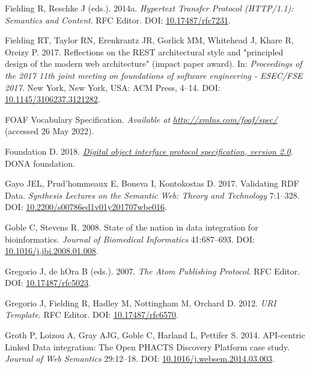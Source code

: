 \begin{CSLReferences}{1}{0}
\leavevmode{}%
Fielding R, Reschke J (eds.). 2014a. \emph{Hypertext Transfer Protocol (HTTP/1.1): Semantics and Content}. RFC Editor. DOI: \href{https://doi.org/10.17487/rfc7231}{10.17487/rfc7231}.

\leavevmode{}%
Fielding RT, Taylor RN, Erenkrantz JR, Gorlick MM, Whitehead J, Khare R, Oreizy P. 2017. Reflections on the REST architectural style and "principled design of the modern web architecture" (impact paper award). In: \emph{Proceedings of the 2017 11th joint meeting on foundations of software engineering - ESEC/FSE 2017}. New York, New York, USA: ACM Press, 4--14. DOI: \href{https://doi.org/10.1145/3106237.3121282}{10.1145/3106237.3121282}.

\leavevmode{}%
FOAF Vocabulary Specification. \emph{Available at} \href{http://xmlns.com/foaf/spec/}{\emph{http://xmlns.com/foaf/spec/}} (accessed 26 May 2022).

\leavevmode{}%
Foundation D. 2018. \emph{\href{https://hdl.handle.net/0.DOIP/DOIPV2.0}{Digital object interface protocol specification, version 2.0}}. DONA foundation.

\leavevmode{}%
Gayo JEL, Prud'hommeaux E, Boneva I, Kontokostas D. 2017. Validating RDF Data. \emph{Synthesis Lectures on the Semantic Web: Theory and Technology} 7:1--328. DOI: \href{https://doi.org/10.2200/s00786ed1v01y201707wbe016}{10.2200/s00786ed1v01y201707wbe016}.

\leavevmode{}%
Goble C, Stevens R. 2008. State of the nation in data integration for bioinformatics. \emph{Journal of Biomedical Informatics} 41:687--693. DOI: \href{https://doi.org/10.1016/j.jbi.2008.01.008}{10.1016/j.jbi.2008.01.008}.

\leavevmode{}%
Gregorio J, de hOra B (eds.). 2007. \emph{The Atom Publishing Protocol}. RFC Editor. DOI: \href{https://doi.org/10.17487/rfc5023}{10.17487/rfc5023}.

\leavevmode{}%
Gregorio J, Fielding R, Hadley M, Nottingham M, Orchard D. 2012. \emph{URI Template}. RFC Editor. DOI: \href{https://doi.org/10.17487/rfc6570}{10.17487/rfc6570}.

\leavevmode{}%
Groth P, Loizou A, Gray AJG, Goble C, Harland L, Pettifer S. 2014. API-centric Linked Data integration: The Open PHACTS Discovery Platform case study. \emph{Journal of Web Semantics} 29:12--18. DOI: \href{https://doi.org/10.1016/j.websem.2014.03.003}{10.1016/j.websem.2014.03.003}.


\end{CSLReferences}
